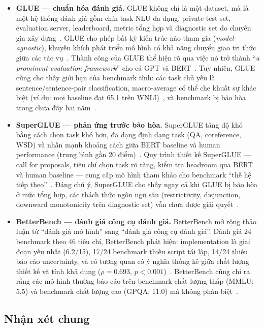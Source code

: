 \begin{itemize}
    \item \textbf{GLUE --- chuẩn hóa đánh giá.} GLUE không chỉ là một dataset, mà là một hệ thống đánh giá gồm chín task NLU đa dạng, private test set, evaluation server, leaderboard, metric tổng hợp và diagnostic set do chuyên gia xây dựng~\cite{glue}. GLUE cho phép bất kỳ kiến trúc nào tham gia (\textit{model-agnostic}), khuyến khích phát triển mô hình có khả năng chuyển giao tri thức giữa các tác vụ~\cite{glue}. Thành công của GLUE thể hiện rõ qua việc nó trở thành ``\textit{a prominent evaluation framework}'' cho cả GPT và BERT~\cite{superglue}. Tuy nhiên, GLUE cũng cho thấy giới hạn của benchmark tĩnh: các task chủ yếu là sentence/sentence-pair classification, macro-average có thể che khuất sự khác biệt (ví dụ: mọi baseline đạt 65.1 trên WNLI)~\cite{glue}, và benchmark bị bão hòa trong chưa đầy hai năm~\cite{superglue}.

    \item \textbf{SuperGLUE --- phản ứng trước bão hòa.} SuperGLUE tăng độ khó bằng cách chọn task khó hơn, đa dạng định dạng task (QA, coreference, WSD) và nhấn mạnh khoảng cách giữa BERT baseline và human performance (trung bình gần 20 điểm)~\cite{superglue}. Quy trình thiết kế SuperGLUE --- call for proposals, tiêu chí chọn task rõ ràng, kiểm tra headroom qua BERT và human baseline --- cung cấp mô hình tham khảo cho benchmark ``thế hệ tiếp theo''~\cite{superglue}. Đáng chú ý, SuperGLUE cho thấy ngay cả khi GLUE bị bão hòa ở mức tổng hợp, các thách thức ngôn ngữ sâu (restrictivity, disjunction, downward monotonicity trên diagnostic set) vẫn chưa được giải quyết~\cite{superglue}.

    \item \textbf{BetterBench --- đánh giá công cụ đánh giá.} BetterBench mở rộng thảo luận từ ``đánh giá mô hình'' sang ``đánh giá công cụ đánh giá''. Đánh giá 24 benchmark theo 46 tiêu chí, BetterBench phát hiện: implementation là giai đoạn yếu nhất (6.2/15), 17/24 benchmark thiếu script tái lập, 14/24 thiếu báo cáo uncertainty, và có tương quan có ý nghĩa thống kê giữa chất lượng thiết kế và tính khả dụng ($\rho = 0.693$, $p < 0.001$)~\cite{betterbench}. BetterBench cũng chỉ ra rằng các mô hình thường báo cáo trên benchmark chất lượng thấp (MMLU: 5.5) và benchmark chất lượng cao (GPQA: 11.0) mà không phân biệt~\cite{betterbench}.
\end{itemize}

\subsection{Nhận xét chung}


